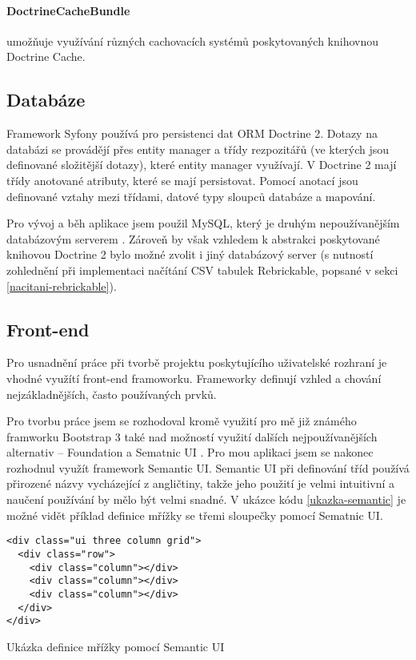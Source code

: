     \paragraph{DoctrineCacheBundle} 
    umožňuje využívání různých cachovacích systémů poskytovaných knihovnou Doctrine Cache. \autocite{doctrinecache}

\subsection{Databáze}
Framework Syfony používá pro persistenci dat \gls{ORM} Doctrine 2. Dotazy na databázi se provádějí přes entity manager a třídy
rezpozitářů (ve kterých jsou definované složitější dotazy), které entity manager využívají. V Doctrine 2 mají třídy anotované atributy, které se mají persistovat. Pomocí anotací jsou definované vztahy mezi třídami, datové typy sloupců databáze a mapování.

Pro vývoj a běh aplikace jsem použil MySQL, který je druhým nepoužívanějším databázovým serverem \autocite{database-servers}. Zároveň by však vzhledem k abstrakci poskytované knihovou Doctrine 2 bylo možné zvolit i jiný databázový server (s nutností zohlednění při implementaci načítání CSV tabulek Rebrickable, popsané v sekci \ref{nacitani-rebrickable}).

\subsection{Front-end}
Pro usnadnění práce při tvorbě projektu poskytujícího uživatelské rozhraní je vhodné využítí front-end framoworku. Frameworky definují vzhled a chování nejzákladnějších, často používaných prvků. 

Pro tvorbu práce jsem se rozhodoval kromě využití pro mě již známého framworku Bootstrap 3 také nad možností využití dalších nejpoužívanějších alternativ – Foundation a Sematnic UI \autocite{web:frameworks}. Pro mou aplikaci jsem se nakonec rozhodnul využít framework Semantic UI. Semantic UI při definování tříd používá přirozené názvy vycházející z angličtiny, takže jeho použití je velmi intuitivní a naučení používání by mělo být velmi snadné. V ukázce kódu \ref{ukazka-semantic} je možné vidět příklad definice mřížky se třemi sloupečky pomocí Sematnic UI.

\begin{listing}[htbp]
  \begin{verbatim}
<div class="ui three column grid">
  <div class="row">
    <div class="column"></div>
    <div class="column"></div>
    <div class="column"></div>
  </div>
</div>
    \end{verbatim}
  \caption{Ukázka definice mřížky pomocí Semantic UI\label{ukazka-semantic}}
\end{listing}

\subsubsection{}